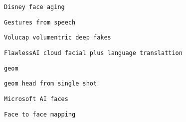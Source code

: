         
         
          \protect\hypertarget{ID_528822265}{}{}

\begin{verbatim}
Disney face aging
\end{verbatim}
         

         
         
          \protect\hypertarget{ID_1074731713}{}{}

\begin{verbatim}
Gestures from speech
\end{verbatim}
         

         
         
          \protect\hypertarget{ID_606217833}{}{}

\begin{verbatim}
Volucap volumentric deep fakes
\end{verbatim}
         

         
         
          \protect\hypertarget{ID_1336984567}{}{}

\begin{verbatim}
FlawlessAI cloud facial plus language translattion
\end{verbatim}
         
       

       
       
        \protect\hypertarget{ID_1121639807}{}{}

\begin{verbatim}
geom
\end{verbatim}

         
         
          \protect\hypertarget{ID_1727751456}{}{}

\begin{verbatim}
geom head from single shot
\end{verbatim}
         

         
         
          \protect\hypertarget{ID_825427447}{}{}

\begin{verbatim}
Microsoft AI faces
\end{verbatim}
         

         
         
          \protect\hypertarget{ID_1136226072}{}{}

\begin{verbatim}
Face to face mapping
\end{verbatim}
         

